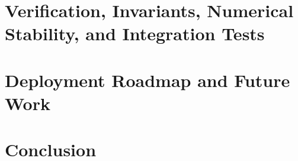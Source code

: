 \documentclass[lettersize,journal, twocolumn]{IEEEtran}
\begin{document}
\section{Verification, Invariants, Numerical Stability, and Integration Tests}
\label{Sec:Section_VIII_Verification_Invariants_Numerical_Stability_and_Integration_Tests}


\section{Deployment Roadmap and Future Work}
\label{Sec:Known_Gaps_and_Next_Steps_Toward_Deployment}


\section{Conclusion}
\label{Sec:Conclusion}





% 
\end{document}
